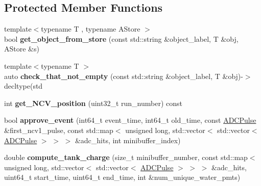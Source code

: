 \subsection*{Protected Member Functions}
\begin{DoxyCompactItemize}
\item 
\hypertarget{classPhaseITreeMaker_a286cdf9bbb6bb90477aa0342250b24c5}{
{\footnotesize template$<$typename T , typename AStore $>$ }\\bool {\bfseries get\_\-object\_\-from\_\-store} (const std::string \&object\_\-label, T \&obj, AStore \&s)}
\label{classPhaseITreeMaker_a286cdf9bbb6bb90477aa0342250b24c5}

\item 
\hypertarget{classPhaseITreeMaker_a66d4fe93f1d5c8d6d939be653b2c91ce}{
{\footnotesize template$<$typename T $>$ }\\auto {\bfseries check\_\-that\_\-not\_\-empty} (const std::string \&object\_\-label, T \&obj)-\/$>$ decltype(std}
\label{classPhaseITreeMaker_a66d4fe93f1d5c8d6d939be653b2c91ce}

\item 
\hypertarget{classPhaseITreeMaker_af70785f235c6dfc44acd219acc49d2ba}{
int {\bfseries get\_\-NCV\_\-position} (uint32\_\-t run\_\-number) const }
\label{classPhaseITreeMaker_af70785f235c6dfc44acd219acc49d2ba}

\item 
\hypertarget{classPhaseITreeMaker_a4d51e9c4ce60a8f932d3719a24c62494}{
bool {\bfseries approve\_\-event} (int64\_\-t event\_\-time, int64\_\-t old\_\-time, const \hyperlink{classADCPulse}{ADCPulse} \&first\_\-ncv1\_\-pulse, const std::map$<$ unsigned long, std::vector$<$ std::vector$<$ \hyperlink{classADCPulse}{ADCPulse} $>$ $>$ $>$ \&adc\_\-hits, int minibuffer\_\-index)}
\label{classPhaseITreeMaker_a4d51e9c4ce60a8f932d3719a24c62494}

\item 
\hypertarget{classPhaseITreeMaker_aa52d9d62bd39a9883fe2d49b8d92de1b}{
double {\bfseries compute\_\-tank\_\-charge} (size\_\-t minibuffer\_\-number, const std::map$<$ unsigned long, std::vector$<$ std::vector$<$ \hyperlink{classADCPulse}{ADCPulse} $>$ $>$ $>$ \&adc\_\-hits, uint64\_\-t start\_\-time, uint64\_\-t end\_\-time, int \&num\_\-unique\_\-water\_\-pmts)}
\label{classPhaseITreeMaker_aa52d9d62bd39a9883fe2d49b8d92de1b}

\end{DoxyCompactItemize}
